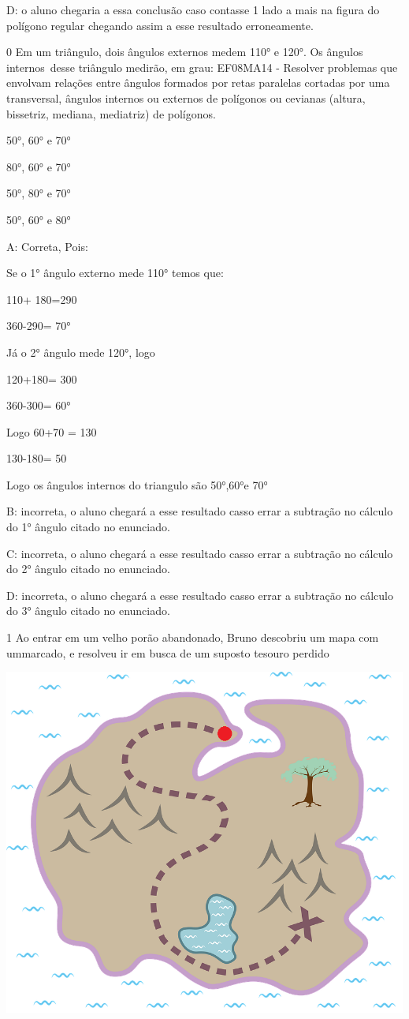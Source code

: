 D: o aluno chegaria a essa conclusão caso contasse 1 lado a mais na
figura do polígono regular chegando assim a esse resultado erroneamente.

\num{0} Em um triângulo, dois ângulos externos medem 110° e 120°. Os ângulos
internos~desse triângulo medirão, em grau: EF08MA14 - Resolver problemas
que envolvam relações entre ângulos formados por retas paralelas
cortadas por uma transversal, ângulos internos ou externos de polígonos
ou cevianas (altura, bissetriz, mediana, mediatriz) de polígonos.

\item 50°, 60° e 70°
\item 80°, 60° e 70°
\item 50°, 80° e 70°
\item 50°, 60° e 80°

A: Correta, Pois:

Se o 1° ângulo externo mede 110° temos que:

110+ 180=290

360-290= 70°

Já o 2° ângulo mede 120°, logo

120+180= 300

360-300= 60°

Logo 60+70 = 130

130-180= 50

Logo os ângulos internos do triangulo são 50°,60°e 70°

B: incorreta, o aluno chegará a esse resultado casso errar a subtração
no cálculo do 1° ângulo citado no enunciado.

C: incorreta, o aluno chegará a esse resultado casso errar a subtração
no cálculo do 2° ângulo citado no enunciado.

D: incorreta, o aluno chegará a esse resultado casso errar a subtração
no cálculo do 3° ângulo citado no enunciado.

\num{1} Ao entrar em um velho porão abandonado, Bruno descobriu um mapa com
um\times marcado, e resolveu ir em busca de um suposto tesouro perdido

\includegraphics[width=2\times 27099in,height=1\times 95in]{./imgSAEB_8_MAT/media/image61.png}

